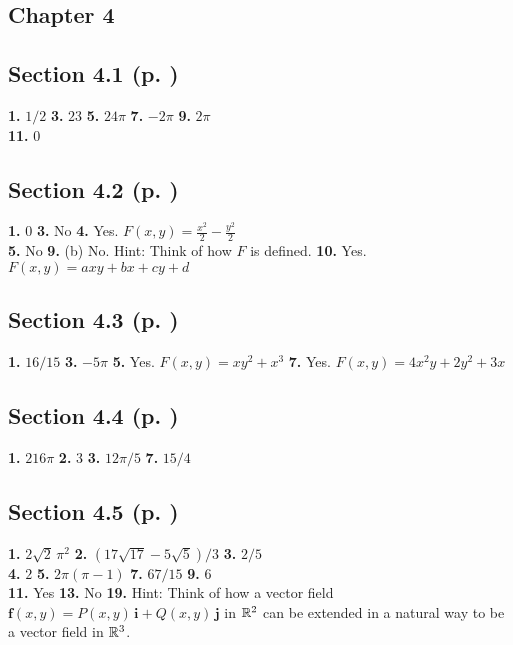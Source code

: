 \begin{multicols}{2}
\section*{Chapter 4}
\subsection*{Section 4.1 (p. \pageref{sec4dot1})}
\textbf{1.} $1/2$\quad
\textbf{3.} $23$\quad
\textbf{5.} $24\pi$\quad
\textbf{7.} $-2\pi$\quad
\textbf{9.} $2\pi$\\\textbf{11.} $0$
\subsection*{Section 4.2 (p. \pageref{sec4dot2})}
\textbf{1.} $0$\quad
\textbf{3.} No\quad
\textbf{4.} Yes. $F(x,y)=\frac{x^2}{2}-\frac{y^2}{2}$\\
\textbf{5.} No\quad
\textbf{9.} (b) No. Hint: Think of how $F$ is defined.\quad
\textbf{10.} Yes. $F(x,y)=axy+bx+cy+d$
\subsection*{Section 4.3 (p. \pageref{sec4dot3})}
\textbf{1.} $16/15$\quad
\textbf{3.} $-5\pi$\quad
\textbf{5.} Yes. $F(x,y)=xy^2 + x^3$\quad
\textbf{7.} Yes. $F(x,y)=4x^2 y + 2y^2 + 3x$
\subsection*{Section 4.4 (p. \pageref{sec4dot4})}
\textbf{1.} $216\pi$\quad
\textbf{2.} $3$\quad
\textbf{3.} $12\pi/5$\quad
\textbf{7.} $15/4$
\subsection*{Section 4.5 (p. \pageref{sec4dot5})}
\textbf{1.} $2\sqrt{2}\,\pi^2$\quad
\textbf{2.} $(17\sqrt{17} - 5\sqrt{5})/3$\quad
\textbf{3.} $2/5$\\
\textbf{4.} $2$ \quad
\textbf{5.} $2\pi (\pi - 1)$ \quad
\textbf{7.} $67/15$ \quad
\textbf{9.} $6$\\
\textbf{11.} Yes \quad
\textbf{13.} No \quad
\textbf{19.} Hint: Think of how a vector field $\textbf{f}(x,y) = P(x,y)\,\textbf{i} + Q(x,y)\,\textbf{j}$ in
$\mathbb{R}^{2}$ can be extended in a natural way to be a vector field in $\mathbb{R}^{3}$.

\end{multicols}
